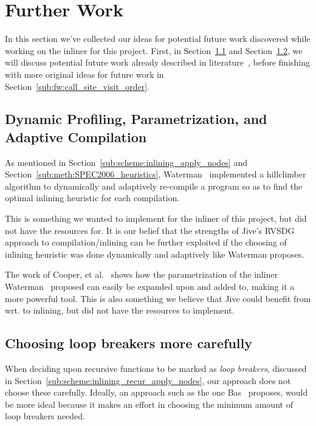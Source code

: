 
\clearpage
\section{Further Work}
\label{sec:further_work}

In this section we've collected our ideas for potential future work discovered
while working on the inliner for this project. First, in
Section~\ref{sub:fw:adaptiv_comp} and Section~\ref{sub:fw:optimal_loop_breakers},
we will discuss potential future work already described in
literature~\cite{AdaptvStratInlSubst,AdaptvCompilAndInlingWaterman,BasMscThesis},
before finishing with more original ideas for future work in Section~\ref{sub:fw:call_site_visit_order}.

\subsection{Dynamic Profiling, Parametrization, and Adaptive Compilation}
\label{sub:fw:adaptiv_comp}

As mentioned in Section~\ref{sub:scheme:inlining_apply_nodes} and
Section~\ref{sub:meth:SPEC2006_heuristics},
Waterman~\cite{AdaptvCompilAndInlingWaterman} implemented a hillclimber
algorithm to dynamically and adaptively re-compile a program so as to find the
optimal inlining heuristic for each compilation.

This is something we wanted to implement for the inliner of this project, but
did not have the resources for. It is our belief that the strengths of Jive's
RVSDG approach to compilation/inlining can be further exploited if the choosing
of inlining heuristic was done dynamically and adaptively like Waterman
proposes.

The work of Cooper, et al.~\cite{AdaptvStratInlSubst} shows how the
parametrization of the inliner Waterman~\cite{AdaptvCompilAndInlingWaterman}
proposed can easily be expanded upon and added to, making it a more powerful
tool. This is also something we believe that Jive could benefit from wrt. to
inlining, but did not have the resources to implement.

\subsection{Choosing loop breakers more carefully}
\label{sub:fw:optimal_loop_breakers}

When deciding upon recursive functions to be marked as \textit{loop breakers},
discussed in Section~\ref{sub:scheme:inlining_recur_apply_nodes}, our approach
does not choose these carefully. Ideally, an approach such as the one
Bas~\cite{BasMscThesis} proposes, would be more ideal because it makes an effort
in choosing the minimum amount of loop breakers needed.

